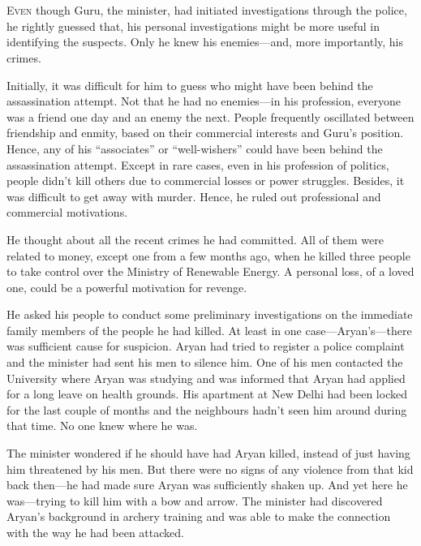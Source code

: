 \chapter{}

\lettrine{E}{ven} though Guru, the minister, had initiated investigations
through the police, he rightly guessed that, his personal
investigations might be more useful in identifying the suspects. Only he knew
his enemies—and, more importantly, his crimes.

Initially, it was difficult for him to guess who might have been behind the
assassination attempt. Not that he had no enemies—in his profession, everyone
was a friend one day and an enemy the next. People frequently oscillated between
friendship and enmity, based on their commercial interests and Guru's position.
Hence, any of his “associates” or “well-wishers” could have been behind the
assassination attempt. Except in rare cases, even in his profession of politics,
people didn't kill others due to commercial losses or power struggles. Besides,
it was difficult to get away with murder. Hence, he ruled out professional and
commercial motivations.

He thought about all the recent crimes he had committed. All of them were
related to money, except one from a few months ago, when he killed three people to
take control over the Ministry of Renewable Energy. A personal loss, of
a loved one, could be a powerful motivation for revenge.

He asked his people to conduct some preliminary investigations on the immediate
family members of the people he had killed. At least in one case—Aryan's—there
was sufficient cause for suspicion. Aryan had tried to register a police
complaint and the minister had sent his men to silence him. One of his men
contacted the University where Aryan was studying and was informed that Aryan
had applied for a long leave on health grounds. His apartment at New Delhi had
been locked for the last couple of months and the neighbours hadn't seen him
around during that time. No one knew where he was.

The minister wondered if he should have had Aryan killed, instead of just having
him threatened by his men. But there were no signs of any violence from that kid
back then—he had made sure Aryan was sufficiently shaken up. And yet here he
was—trying to kill him with a bow and arrow. The minister had discovered Aryan's
background in archery training and was able to make the connection with the way
he had been attacked.

